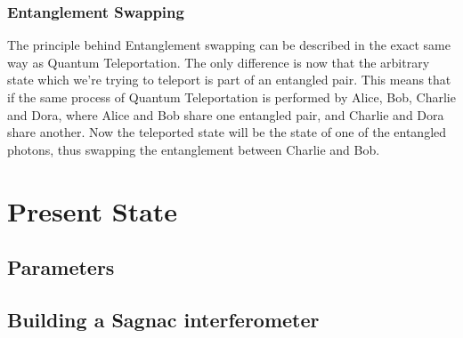 \documentclass{article}
\begin{document}
\subsubsection{Entanglement Swapping}
The principle behind Entanglement swapping can be described in the exact same way as Quantum Teleportation. The only difference is now that the arbitrary
state which we're trying to teleport is part of an entangled pair. This means that if the same process of Quantum Teleportation is performed by Alice, Bob,
Charlie and Dora, where Alice and Bob share one entangled pair, and Charlie and Dora share another. Now the teleported state will be the state of 
one of the entangled photons, thus swapping the entanglement between Charlie and Bob.

\section{Present State}
\subsection{Parameters}
\subsection{Building a Sagnac interferometer}
\end{document}
